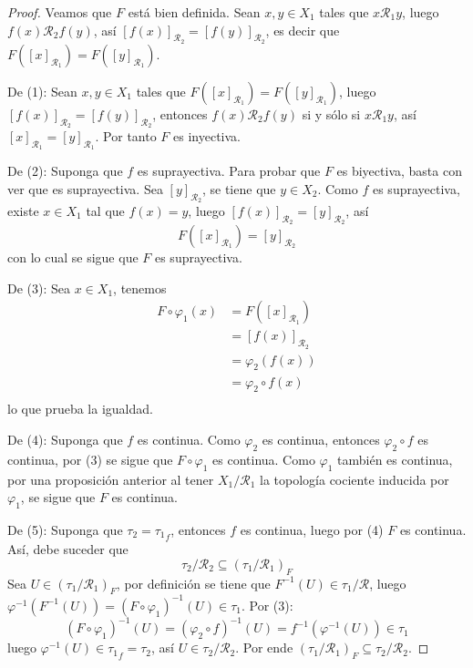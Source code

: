 \documentclass[12pt]{report}
\theoremstyle{largebreak}
\begin{document}
    \begin{proof}
        Veamos que $F$ está bien definida. Sean $x,y\in X_1$ tales que $x\mathcal{R}_1y$, luego $f(x)\mathcal{R}_2f(y)$, así $[f(x)]_{\mathcal{R}_2}=[f(y)]_{\mathcal{R}_2}$, es decir que $F([x]_{\mathcal{R}_1})=F([y]_{\mathcal{R}_1})$.

        De (1): Sean $x,y\in X_1$ tales que $F([x]_{\mathcal{R}_1})=F([y]_{\mathcal{R}_1})$, luego $[f(x)]_{\mathcal{R}_2}=[f(y)]_{\mathcal{R}_2}$, entonces $f(x)\mathcal{R}_2f(y)$ si y sólo si $x\mathcal{R}_1y$, así $[x]_{\mathcal{R}_1}=[y]_{\mathcal{R}_1}$. Por tanto $F$ es inyectiva.

        De (2): Suponga que $f$ es suprayectiva. Para probar que $F$ es biyectiva, basta con ver que es suprayectiva. Sea $[y]_{\mathcal{R}_2}$, se tiene que $y\in X_2$. Como $f$ es suprayectiva, existe $x\in X_1$ tal que $f(x)=y$, luego $[f(x)]_{\mathcal{R}_2}=[y]_{\mathcal{R}_2}$, así
        \begin{equation*}
            F([x]_{\mathcal{R}_1})=[y]_{\mathcal{R}_2}
        \end{equation*}
        con lo cual se sigue que $F$ es suprayectiva.
         
        De (3): Sea $x\in X_1$, tenemos
        \begin{equation*}
            \begin{split}
                F\circ\varphi_1(x)&=F([x]_{\mathcal{R}_1})\\
                &=[f(x)]_{\mathcal{R}_2}\\
                &=\varphi_2(f(x))\\
                &=\varphi_2\circ f(x)\\
            \end{split}
        \end{equation*}
        lo que prueba la igualdad.

        De (4): Suponga que $f$ es continua. Como $\varphi_2$ es continua, entonces $\varphi_2\circ f$ es continua, por (3) se sigue que $F\circ\varphi_1$ es continua. Como $\varphi_1$ también es continua, por una proposición anterior al tener $X_1/\mathcal{R}_1$ la topología cociente inducida por $\varphi_1$, se sigue que $F$ es continua.

        De (5): Suponga que $\tau_2={\tau_1}_f$, entonces $f$ es continua, luego por (4) $F$ es continua. Así, debe suceder que
        \begin{equation*}
            \tau_2/\mathcal{R}_2\subseteq\left(\tau_1/\mathcal{R}_1\right)_F
        \end{equation*}
        Sea $U\in\left(\tau_1/\mathcal{R}_1\right)_F$, por definición se tiene que $F^{-1}(U)\in\tau_1/\mathcal{R}$, luego $\varphi^{-1}(F^{-1}(U))=(F\circ\varphi_1)^{-1}(U)\in\tau_1$. Por (3):
        \begin{equation*}
            (F\circ\varphi_1)^{-1}(U)=(\varphi_2\circ f)^{-1}(U)=f^{-1}(\varphi^{-1}(U))\in\tau_1
        \end{equation*}
        luego $\varphi^{-1}(U)\in{\tau_1}_f=\tau_2$, así $U\in\tau_2/\mathcal{R}_2$. Por ende $\left(\tau_1/\mathcal{R}_1\right)_F\subseteq\tau_2/\mathcal{R}_2$.


\end{proof}
\end{document}
